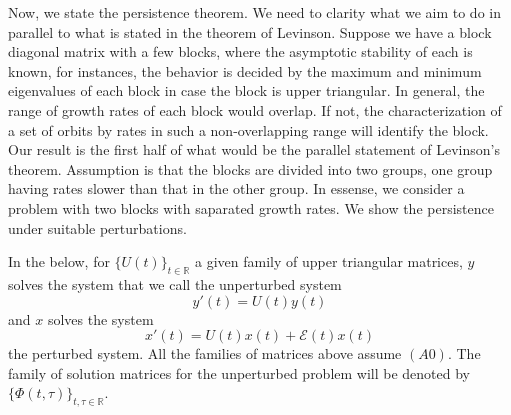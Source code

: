 \documentclass[a4paper,11pt]{article}
\newcommand{\E}{\mathcal{E}}
\theoremstyle{remark}
\begin{document}
Now, we state the persistence theorem. We need to clarity what we aim to do in parallel to what is stated in the theorem of Levinson. Suppose we have a block diagonal matrix with a few   blocks, where the asymptotic stability of each is known, for instances, the behavior is decided by the maximum and minimum eigenvalues of each block in case the block is upper triangular. In general, the range of growth rates of each block would overlap. If not, the  characterization of a set of orbits by rates in such a non-overlapping range will identify the block. Our result is the first half of what would be the parallel statement of Levinson's theorem. Assumption is that the blocks are divided into two groups, one group having rates slower than that in the other group. In essense, we consider a problem with two blocks with saparated growth rates. We show the persistence under suitable perturbations.

In the below, for $\{U(t)\}_{t \in \mathbb{R}}$ a given family of upper triangular matrices, $y$ solves the system that we call the unperturbed system
\begin{equation}\label{eq:1}
 y'(t)=U(t)y(t)
\end{equation}
and $x$ solves the system
\begin{equation}\label{eq:2}
 x'(t) = U(t)x(t) + \E(t)x(t)
\end{equation}
the perturbed system. All the families of matrices above assume $(A0)$. The family of solution matrices for the unperturbed problem will be denoted by $\{\Phi(t,\tau)\}_{t,\tau \in \mathbb{R}}$.

% 
% 
% 
% 
% 
% 
\end{document}
